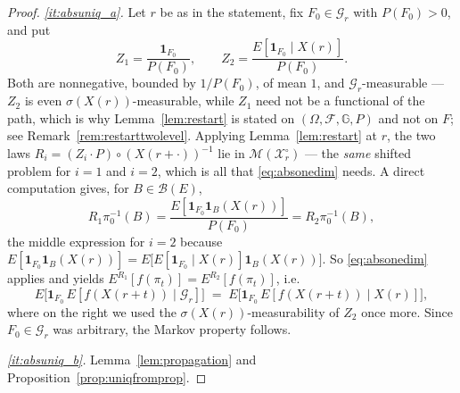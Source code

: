 \documentclass[11pt,a4paper]{article}
\theoremstyle{plain}
\theoremstyle{definition}
\theoremstyle{remark}
\newcommand{\Bor}{\mathcal{B}}                 %
\newcommand{\Filt}{\mathcal{F}}
\newcommand{\Gilt}{\mathcal{G}}
\newcommand{\XX}{\mathcal{X}}                  %
\newcommand{\Msol}{\mathcal{M}}
\newcommand{\one}{\mathbf{1}}
\begin{document}
\begin{proof}
  \emph{\ref{it:absuniq_a}.}
  Let $r$ be as in the statement, fix $F_0 \in \Gilt_r$ with $P(F_0)>0$, and put
  \[
    Z_1 = \frac{\one_{F_0}}{P(F_0)} , \qquad
    Z_2 = \frac{E[\one_{F_0} \mid X(r)]}{P(F_0)} .
  \]
  Both are nonnegative, bounded by $1/P(F_0)$, of mean $1$, and
  $\Gilt_r$-measurable --- $Z_2$ is even $\sigma(X(r))$-measurable, while $Z_1$
  need not be a functional of the path, which is why
  Lemma~\ref{lem:restart} is stated on $(\Omega,\Filt,\mathbb{G},P)$ and not on
  $F$; see Remark~\ref{rem:restarttwolevel}.  Applying
  Lemma~\ref{lem:restart} at $r$, the two laws
  $R_i = (Z_i \cdot P) \circ (X(r+\cdot))^{-1}$ lie in $\Msol(\XX^\circ_r)$ ---
  the \emph{same} shifted problem for $i=1$ and $i=2$, which is all that
  \eqref{eq:absonedim} needs.
  A direct computation gives, for $B \in \Bor(E)$,
  \[
    R_1 \pi_0^{-1}(B) = \frac{E[\one_{F_0} \one_B(X(r))]}{P(F_0)}
      = R_2 \pi_0^{-1}(B) ,
  \]
  the middle expression for $i=2$ because
  $E[\one_{F_0} \one_B(X(r))] = E\bigl[E[\one_{F_0}\mid X(r)] \one_B(X(r))\bigr]$.
  So \eqref{eq:absonedim} applies and yields
  $E^{R_1}[f(\pi_t)] = E^{R_2}[f(\pi_t)]$, i.e.
  \[
    E\bigl[ \one_{F_0} \, E[f(X(r+t)) \mid \Gilt_r] \bigr]
      \;=\; E\bigl[ \one_{F_0} \, E[f(X(r+t)) \mid X(r)] \bigr] ,
  \]
  where on the right we used the $\sigma(X(r))$-measurability of $Z_2$ once more.
  Since $F_0 \in \Gilt_r$ was arbitrary, the Markov property follows.

  \emph{\ref{it:absuniq_b}.}  Lemma~\ref{lem:propagation} and
  Proposition~\ref{prop:uniqfromprop}.
\end{proof}
\end{document}
